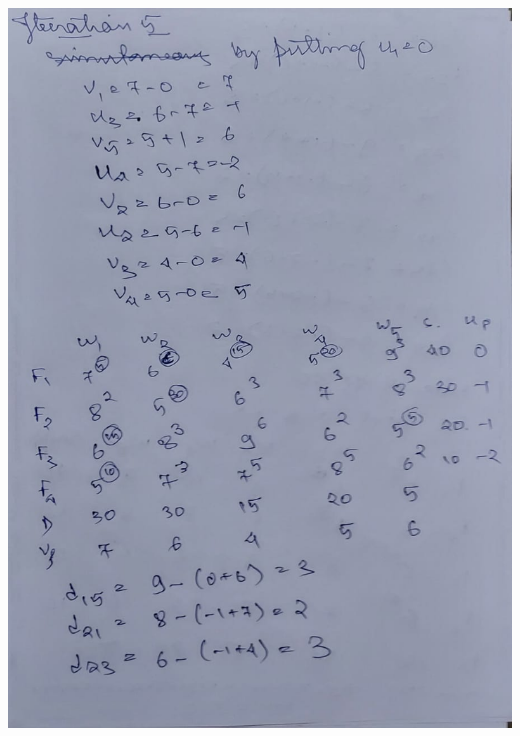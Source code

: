 \documentclass[12pt, letterpaper, twoside]{book}
\begin{document}
\includegraphics[width=\paperwidth, height=\paperheight]{Page18}
\end{document}
